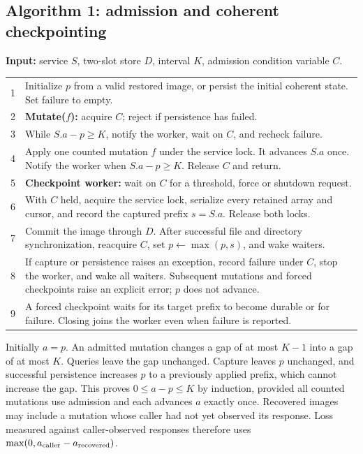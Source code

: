 \documentclass[10pt]{article}
\begin{document}
\subsection{Algorithm 1: admission and coherent checkpointing}
\noindent\textbf{Input:} service $S$, two-slot store $D$, interval $K$, admission condition variable $C$.\par
\smallskip
\noindent\begin{tabular}{@{}r p{.90\linewidth}@{}}
1 & Initialize $p$ from a valid restored image, or persist the initial coherent state. Set failure to empty.\\
2 & \textbf{Mutate($f$):} acquire $C$; reject if persistence has failed.\\
3 & While $S.a-p\geq K$, notify the worker, wait on $C$, and recheck failure.\\
4 & Apply one counted mutation $f$ under the service lock. It advances $S.a$ once. Notify the worker when $S.a-p\geq K$. Release $C$ and return.\\
5 & \textbf{Checkpoint worker:} wait on $C$ for a threshold, force or shutdown request.\\
6 & With $C$ held, acquire the service lock, serialize every retained array and cursor, and record the captured prefix $s=S.a$. Release both locks.\\
7 & Commit the image through $D$. After successful file and directory synchronization, reacquire $C$, set $p\leftarrow\max(p,s)$, and wake waiters.\\
8 & If capture or persistence raises an exception, record failure under $C$, stop the worker, and wake all waiters. Subsequent mutations and forced checkpoints raise an explicit error; $p$ does not advance.\\
9 & A forced checkpoint waits for its target prefix to become durable or for failure. Closing joins the worker even when failure is reported.\\
\end{tabular}
\smallskip

Initially $a=p$. An admitted mutation changes a gap of at most $K-1$ into a gap of at most $K$. Queries leave the gap unchanged. Capture leaves $p$ unchanged, and successful persistence increases $p$ to a previously applied prefix, which cannot increase the gap. This proves $0\leq a-p\leq K$ by induction, provided all counted mutations use admission and each advances $a$ exactly once. Recovered images may include a mutation whose caller had not yet observed its response. Loss measured against caller-observed responses therefore uses $\max(0,a_{\rm caller}-a_{\rm recovered})$.
\end{document}
